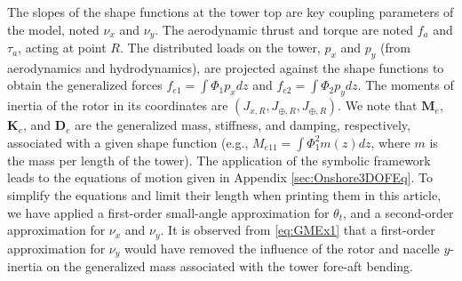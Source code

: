 \documentclass[wes, manuscript]{copernicus}
\renewcommand{\v}[1]{\boldsymbol{#1}}
\newcommand{\m}[1]{\boldsymbol{#1}}
\begin{document}
The slopes of the shape functions at the tower top are key coupling parameters of the model, noted $\nu_x$ and $\nu_y$. 
The aerodynamic thrust and torque are noted $f_a$ and $\tau_a$, acting at point $R$.
The distributed loads on the tower, $p_x$ and $p_y$ (from aerodynamics and hydrodynamics), are projected against the shape functions to obtain the generalized forces $f_{e1}=\int \Phi_1 p_x dz$ and  $f_{e2}=\int \Phi_2 p_y dz$. 
The moments of inertia of the rotor in its coordinates are $(J_{x,R}, J_{\oplus,R}, J_{\oplus,R})$.
We note that $\m{M}_e$, $\m{K}_e$, and $\m{D}_e$ are the generalized mass, stiffness, and damping, respectively, associated with a given shape function (e.g., $M_{e11}=\int \Phi_1^2 m(z) dz$, where $m$ is the mass per length of the tower). 
The application of the symbolic framework leads to the equations of motion given in Appendix \ref{sec:Onshore3DOFEq}.
To simplify the equations and limit their length when printing them in this article, we have applied a first-order small-angle approximation for $\theta_t$, and a second-order approximation for $\nu_x$ and $\nu_y$.
It is observed from \autoref{eq:GMEx1} that a first-order approximation for $\nu_y$ would have removed the influence of the rotor and nacelle $y$-inertia on the generalized mass associated with the tower fore-aft bending. 
\end{document}
